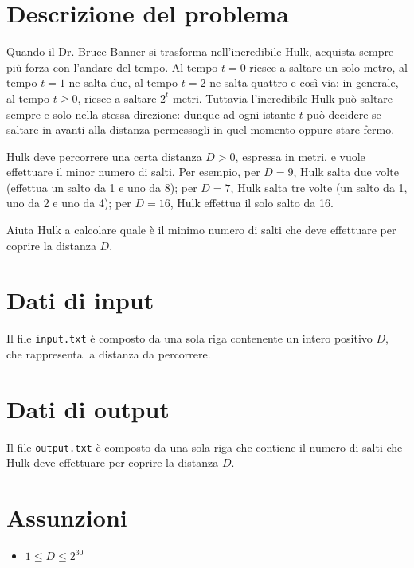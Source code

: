 \documentclass[a4paper,11pt]{article}
\begin{document}
\vspace{0.5cm}



\section*{Descrizione del problema}
   Quando il Dr. Bruce Banner si trasforma nell'incredibile Hulk,
acquista sempre più forza con l'andare del tempo. Al
tempo $t=0$ riesce a saltare un solo metro, al
tempo $t=1$ ne salta due, al tempo $t=2$ ne salta
quattro e così via: in generale, al tempo $t ≥ 0$,
riesce a saltare $2^{t}$ metri. Tuttavia l'incredibile Hulk
può saltare sempre e solo nella stessa direzione: dunque ad ogni istante $t$
può decidere se saltare in avanti alla distanza permessagli in quel momento
oppure stare fermo.

Hulk deve percorrere una certa distanza $D > 0$, espressa
in metri, e vuole effettuare il minor numero di salti. Per esempio,
per $D=9$, Hulk salta due volte (effettua un salto da 1 e uno
da 8); per $D=7$, Hulk salta tre volte (un salto da 1, uno da
2 e uno da 4); per $D=16$, Hulk effettua il solo salto da 16.

Aiuta Hulk a calcolare quale è il minimo numero di salti che
deve effettuare per coprire la distanza $D$.


\section*{Dati di input}
  
Il file \texttt{input.txt} è composto da una sola riga
  contenente un intero positivo $D$, che rappresenta la
  distanza da percorrere. 


\section*{Dati di output}
  
Il file \texttt{output.txt} è composto da una sola riga che
contiene il numero di salti che Hulk deve effettuare per coprire la
distanza $D$.

  \section*{Assunzioni}
  \begin{itemize}
  
    \item $1 ≤ D ≤ 2^{30}$
  \end{itemize}
\end{document}
